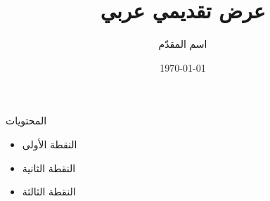 \documentclass{beamer}
\title{عرض تقديمي عربي}
\author{اسم المقدّم}
\date{\today}
\begin{document}
\begin{frame}
  \titlepage
\end{frame}

\begin{frame}{المحتويات}
  \begin{itemize}
    \item النقطة الأولى
    \item النقطة الثانية
    \item النقطة الثالثة
  \end{itemize}
\end{frame}
\end{document}
